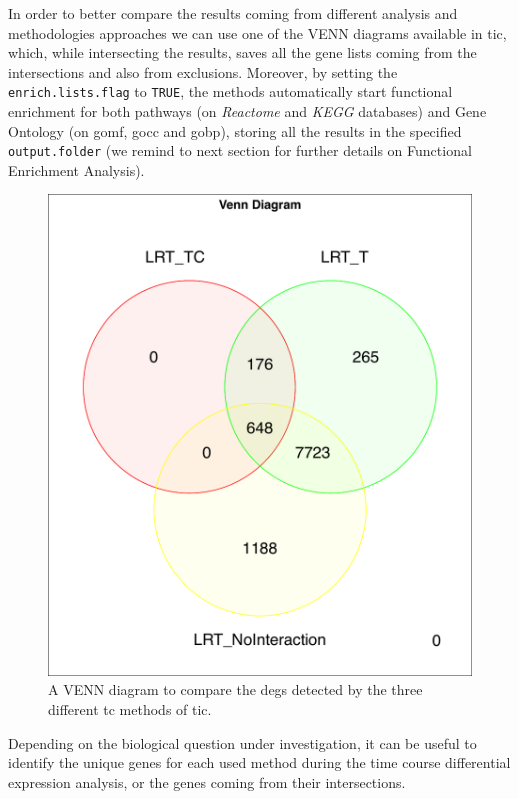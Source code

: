 In order to better compare the results coming from different analysis and methodologies approaches we can use one of the VENN diagrams available in \gls{tic}, which, while intersecting the results, saves all the gene lists coming from the intersections and also from exclusions.
Moreover, by setting the \lstinline!enrich.lists.flag! to \lstinline!TRUE!, the methods automatically start functional enrichment for both pathways (on \textit{Reactome} and \textit{KEGG} databases) and Gene Ontology (on \gls{gomf}, \gls{gocc} and \gls{gobp}), storing all the results in the specified \lstinline!output.folder! (we remind to next section for further details on Functional Enrichment Analysis).

\begin{figure}[H]
\includegraphics[width=\textwidth,height=\textheight,keepaspectratio]{img/ticorser/de/venn3.pdf}
\caption[ticorser venn diagram]{A VENN diagram to compare the \glspl{deg} detected by the three different \gls{tc} methods of \gls{tic}.}
\label{fig:ticorservenn}
\centering
\end{figure}

Depending on the biological question under investigation, it can be useful to identify the unique genes for each used method during the time course differential expression analysis, or the genes coming from their intersections.

